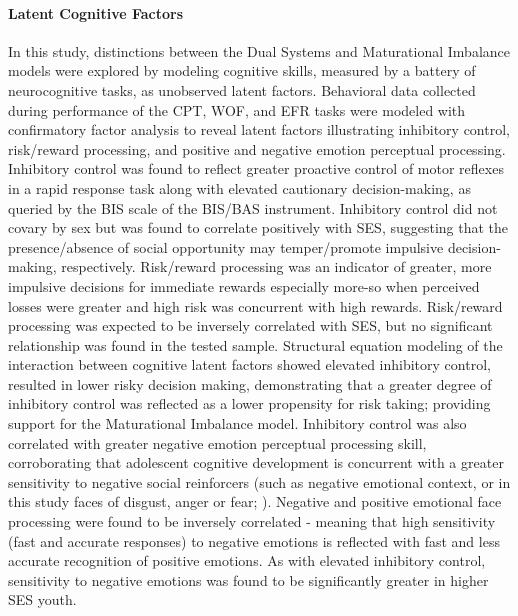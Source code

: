 \documentclass{article}%
\begin{document}
\paragraph*{Latent Cognitive Factors} In this study, distinctions between the Dual Systems and Maturational Imbalance models were explored by modeling cognitive skills, measured by a battery of neurocognitive tasks, as unobserved latent factors. Behavioral data collected during performance of the CPT, WOF, and EFR tasks were modeled with confirmatory factor analysis to reveal latent factors illustrating inhibitory control, risk/reward processing, and positive and negative emotion perceptual processing. Inhibitory control was found to reflect greater proactive control of motor reflexes in a rapid response task along with elevated cautionary decision-making, as queried by the BIS scale of the BIS/BAS instrument. Inhibitory control did not covary by sex but was found to correlate positively with SES, suggesting that the presence/absence of social opportunity may temper/promote impulsive decision-making, respectively. Risk/reward processing was an indicator of greater, more impulsive decisions for immediate rewards \textemdash especially more-so when perceived losses were greater and high risk was concurrent with high rewards. Risk/reward processing was expected to be inversely correlated with SES, but no significant relationship was found in the tested sample. Structural equation modeling of the interaction between cognitive latent factors showed elevated inhibitory control, resulted in lower risky decision making, demonstrating that a greater degree of inhibitory control was reflected as a lower propensity for risk taking; providing support for the Maturational Imbalance model. Inhibitory control was also correlated with greater negative emotion perceptual processing skill, corroborating that adolescent cognitive development is concurrent with a greater sensitivity to negative social reinforcers (such as negative emotional context, or in this study faces of disgust, anger or fear; \cite{jones2014adolescent, rosenbaum2020valence}). Negative and positive emotional face processing were found to be inversely correlated - meaning that high sensitivity (fast and accurate responses) to negative emotions is reflected with fast and less accurate recognition of positive emotions. As with elevated inhibitory control, sensitivity to negative emotions was found to be significantly greater in higher SES youth. 
\end{document}
